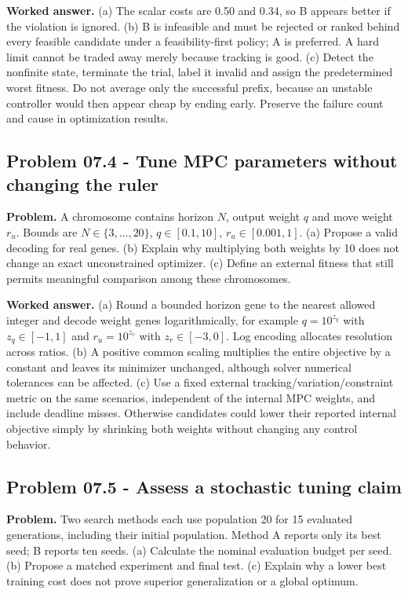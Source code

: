 \documentclass[11pt,a4paper]{article}
\begin{document}
\textbf{Worked answer.} (a) The scalar costs are 0.50 and 0.34, so B appears better if the violation is ignored. (b) B is infeasible and must be rejected or ranked behind every feasible candidate under a feasibility-first policy; A is preferred. A hard limit cannot be traded away merely because tracking is good. (c) Detect the nonfinite state, terminate the trial, label it invalid and assign the predetermined worst fitness. Do not average only the successful prefix, because an unstable controller would then appear cheap by ending early. Preserve the failure count and cause in optimization results.

\subsection{Problem 07.4 - Tune MPC parameters without changing the ruler}
\textbf{Problem.} A chromosome contains horizon $N$, output weight $q$ and move weight $r_u$. Bounds are $N\in\{3,\ldots,20\}$, $q\in[0.1,10]$, $r_u\in[0.001,1]$. (a) Propose a valid decoding for real genes. (b) Explain why multiplying both weights by 10 does not change an exact unconstrained optimizer. (c) Define an external fitness that still permits meaningful comparison among these chromosomes.


\textbf{Worked answer.} (a) Round a bounded horizon gene to the nearest allowed integer and decode weight genes logarithmically, for example $q=10^{z_q}$ with $z_q\in[-1,1]$ and $r_u=10^{z_r}$ with $z_r\in[-3,0]$. Log encoding allocates resolution across ratios. (b) A positive common scaling multiplies the entire objective by a constant and leaves its minimizer unchanged, although solver numerical tolerances can be affected. (c) Use a fixed external tracking/variation/constraint metric on the same scenarios, independent of the internal MPC weights, and include deadline misses. Otherwise candidates could lower their reported internal objective simply by shrinking both weights without changing any control behavior.

\subsection{Problem 07.5 - Assess a stochastic tuning claim}
\textbf{Problem.} Two search methods each use population 20 for 15 evaluated generations, including their initial population. Method A reports only its best seed; B reports ten seeds. (a) Calculate the nominal evaluation budget per seed. (b) Propose a matched experiment and final test. (c) Explain why a lower best training cost does not prove superior generalization or a global optimum.
\end{document}
